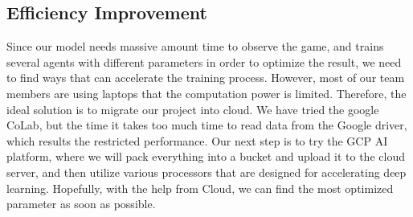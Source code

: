\documentclass{article}
\begin{document}
\subsection{Efficiency Improvement}
Since our model needs massive amount time to observe the game, and trains several agents with different parameters in order to optimize the result, we need to find ways that can accelerate the training process. However, most of our team members are using laptops that the computation power is limited. Therefore, the ideal solution is to migrate our project into cloud. We have tried the google CoLab, but the time it takes too much time to read data from the Google driver, which results the restricted performance. Our next step is to try the GCP AI platform, where we will pack everything into a bucket and upload it to the cloud server, and then utilize various processors that are designed for accelerating deep learning. Hopefully, with the help from Cloud, we can find the most optimized parameter as soon as possible. 

% 
% 
\end{document}
